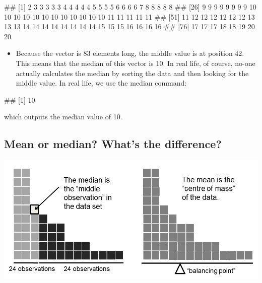 \documentclass[
]{book}
\newenvironment{Shaded}{\begin{snugshade}}{\end{snugshade}}
\newcommand{\FunctionTok}[1]{\textcolor[rgb]{0.13,0.29,0.53}{\textbf{#1}}}
\newcommand{\NormalTok}[1]{#1}
\newcommand{\SpecialCharTok}[1]{\textcolor[rgb]{0.81,0.36,0.00}{\textbf{#1}}}
\providecommand{\tightlist}{%
  \setlength{\itemsep}{0pt}\setlength{\parskip}{0pt}}
\begin{document}
\begin{Shaded}
\end{Shaded}

\begin{Shaded}
\begin{Highlighting}[]
\NormalTok{\#\#  [1]  2  3  3  3  3  3  4  4  4  4  4  5  5  5  5  6  6  6  6  7  8  8  8  8  8}
\NormalTok{\#\# [26]  9  9  9  9  9  9  9  9 10 10 10 10 10 10 10 10 10 10 10 10 11 11 11 11 11}
\NormalTok{\#\# [51] 11 12 12 12 12 12 12 13 13 13 14 14 14 14 14 14 14 14 15 15 15 16 16 16 16}
\NormalTok{\#\# [76] 17 17 17 18 18 19 20 20}
\end{Highlighting}
\end{Shaded}

\begin{itemize}
\tightlist
\item
  Because the vector is 83 elements long, the middle value is at position 42. This means that the median of this vector is 10. In real life, of course, no-one actually calculates the median by sorting the data and then looking for the middle value. In real life, we use the median command:
\end{itemize}

\begin{Shaded}
\end{Shaded}

\begin{Shaded}
\begin{Highlighting}[]
\NormalTok{\#\# [1] 10}
\end{Highlighting}
\end{Shaded}

which outputs the median value of 10.

\hypertarget{mean-or-median-whats-the-difference}{%
\subsection{Mean or median? What's the difference?}\label{mean-or-median-whats-the-difference}}

\includegraphics{./img/descriptives2/meanmedian.png}
\end{document}
